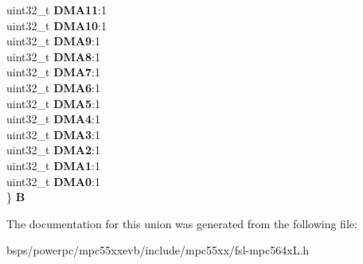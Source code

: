 \begin{DoxyCompactItemize}
\begin{tabbing}
\>uint32\_t {\bfseries DMA11}:1\\
\>uint32\_t {\bfseries DMA10}:1\\
\>uint32\_t {\bfseries DMA9}:1\\
\>uint32\_t {\bfseries DMA8}:1\\
\>uint32\_t {\bfseries DMA7}:1\\
\>uint32\_t {\bfseries DMA6}:1\\
\>uint32\_t {\bfseries DMA5}:1\\
\>uint32\_t {\bfseries DMA4}:1\\
\>uint32\_t {\bfseries DMA3}:1\\
\>uint32\_t {\bfseries DMA2}:1\\
\>uint32\_t {\bfseries DMA1}:1\\
\>uint32\_t {\bfseries DMA0}:1\\
\} {\bfseries B}\\

\end{tabbing}\end{DoxyCompactItemize}


The documentation for this union was generated from the following file\+:\begin{DoxyCompactItemize}
\item 
bsps/powerpc/mpc55xxevb/include/mpc55xx/fsl-\/mpc564x\+L.\+h\end{DoxyCompactItemize}
